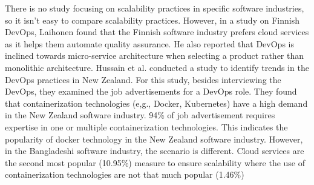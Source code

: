 There is no study focusing on scalability practices in specific software industries, so it isn't easy to compare scalability practices. However, in a study on Finnish DevOps, Laihonen\cite{Laihonen2018} found that the Finnish software industry prefers cloud services as it helps them automate quality assurance. He also reported that DevOps is inclined towards micro-service architecture when selecting a product rather than monolithic architecture. Hussain et al.\cite{Hussain2017} conducted a study to identify trends in the DevOps practices in New Zealand. For this study, besides interviewing the DevOps, they examined the job advertisements for a DevOps role. They found that containerization technologies (e,g., Docker, Kubernetes) have a high demand in the New Zealand software industry. 94\% of job advertisement requires expertise in one or multiple containerization technologies. This indicates the popularity of docker technology in the New Zealand software industry. However, in the Bangladeshi software industry, the scenario is different. Cloud services are the second most popular (10.95\%) measure to ensure scalability where the use of containerization technologies are not that much popular (1.46\%)